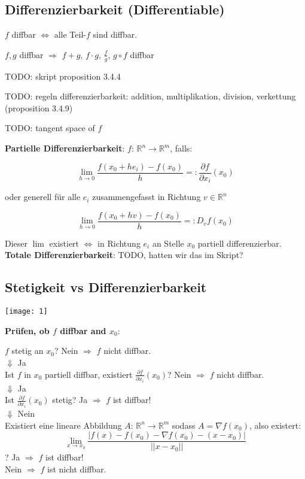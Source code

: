 \subsection{Differenzierbarkeit (Differentiable)}

$f$ diffbar $\Leftrightarrow$ alle Teil-$f$ sind diffbar.

$f,g$ diffbar $\Rightarrow$ $f+g$, $f \cdot g$, $\frac{f}{g}$, $g \circ f$ diffbar

TODO: skript proposition 3.4.4

TODO: regeln differenzierbarkeit: addition, multiplikation, division, verkettung (proposition 3.4.9)

TODO: tangent space of $f$

\textbf{Partielle Differenzierbarkeit}: $f$: $\mathbb{R}^n \rightarrow \mathbb{R}^m$, falls:

\[
    \lim_{h \rightarrow 0} \frac{f(x_0 + h e_i)-f(x_0)}{h} =: \frac{\partial f}{\partial x_i}(x_0)
\]

oder generell für alle $e_i$ zusammengefasst in Richtung $v \in \mathbb{R}^n$

\[
    \lim_{h \rightarrow 0} \frac{f(x_0 + h v)-f(x_0)}{h} =: D_v f(x_0)
\]

Dieser $\lim$ existiert $\Leftrightarrow$ in Richtung $e_i$ an Stelle $x_0$ partiell differenzierbar.\\

\textbf{Totale Differenzierbarkeit}: TODO, hatten wir das im Skript?

\subsection{Stetigkeit vs Differenzierbarkeit}

\texttt{[image: 1]}

\textbf{Prüfen, ob $f$ diffbar and $x_0$}:

$f$ stetig an $x_0$? Nein $\Rightarrow$ $f$ nicht diffbar.\\
$\Downarrow$ Ja\\
Ist $f$ in $x_0$ partiell diffbar, existiert $\frac{\partial f}{\partial x_i}(x_0)$? Nein $\Rightarrow$ $f$ nicht diffbar.\\
$\Downarrow$ Ja\\
Ist $\frac{\partial f}{\partial x_i}(x_0)$ stetig? Ja $\Rightarrow$ $f$ ist diffbar!\\
$\Downarrow$ Nein\\
Existiert eine lineare Abbildung $A$: $\mathbb{R}^n \rightarrow \mathbb{R}^m$ sodass $A=\nabla f(x_0)$, also existert:
\[
    \lim_{x\rightarrow x_0} \frac{|f(x)-f(x_0)-\nabla f(x_0) - (x-x_0)|}{||x-x_0||}
\]?
Ja $\Rightarrow$ $f$ ist diffbar!\\
Nein $\Rightarrow$ $f$ ist nicht diffbar.

